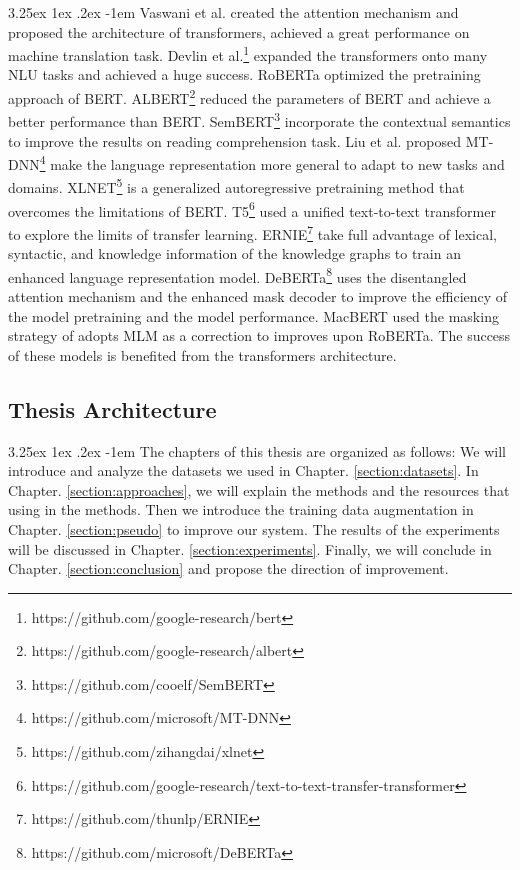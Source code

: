 \documentclass[12pt]{article}
\makeatletter
\renewcommand\paragraph{\@startsection{paragraph}{5}{\z@}%
  {3.25ex \@plus1ex \@minus.2ex}%
  {-1em}%
  {\normalfont\normalsize\bfseries}}
\makeatother
\begin{document}
\begin{CJK*}{UTF8}{bkai}
\begin{spacing}{1.77}
\paragraph{}
Vaswani et al.\cite{vaswani2017attention} created the attention mechanism and proposed the architecture of transformers, achieved a great performance on machine translation task. Devlin et al.\footnote{https://github.com/google-research/bert}\cite{devlin2018bert} expanded the transformers onto many NLU tasks and achieved a huge success. RoBERTa\cite{liu2019roberta} optimized the pretraining approach of BERT. ALBERT\footnote{https://github.com/google-research/albert}\cite{lan2020albert} reduced the parameters of BERT and achieve a better performance than BERT. SemBERT\footnote{https://github.com/cooelf/SemBERT}\cite{zhang2020sembert} incorporate the contextual semantics to improve the results on reading comprehension task. Liu et al.\cite{liu2019mtdnn} proposed MT-DNN\footnote{https://github.com/microsoft/MT-DNN} make the language representation more general to adapt to new tasks and domains. XLNET\footnote{https://github.com/zihangdai/xlnet}\cite{yang2020xlnet} is a generalized autoregressive pretraining method that overcomes the limitations of BERT. T5\footnote{https://github.com/google-research/text-to-text-transfer-transformer}\cite{raffel2020t5} used a unified text-to-text transformer to explore the limits of transfer learning. ERNIE\footnote{https://github.com/thunlp/ERNIE}\cite{zhang2019ernie} take full advantage of lexical, syntactic, and knowledge information of the knowledge graphs to train an enhanced language representation model. DeBERTa\footnote{https://github.com/microsoft/DeBERTa}\cite{he2021deberta} uses the disentangled attention mechanism and the enhanced mask decoder to improve the efficiency of the model pretraining and the model performance. MacBERT\cite{Cui_2020} used the masking strategy of adopts MLM as a correction to improves upon RoBERTa. The success of these models is benefited from the transformers architecture.

\subsection{Thesis Architecture}
\paragraph{}
The chapters of this thesis are organized as follows: We will introduce and analyze the datasets we used in Chapter. \ref{section:datasets}. In Chapter. \ref{section:approaches}, we will explain the methods and the resources that using in the methods. Then we introduce the training data augmentation in Chapter. \ref{section:pseudo} to improve our system. The results of the experiments will be discussed in Chapter. \ref{section:experiments}. Finally, we will conclude in Chapter. \ref{section:conclusion} and propose the direction of improvement.


\end{spacing}
\end{CJK*}
\end{document}
